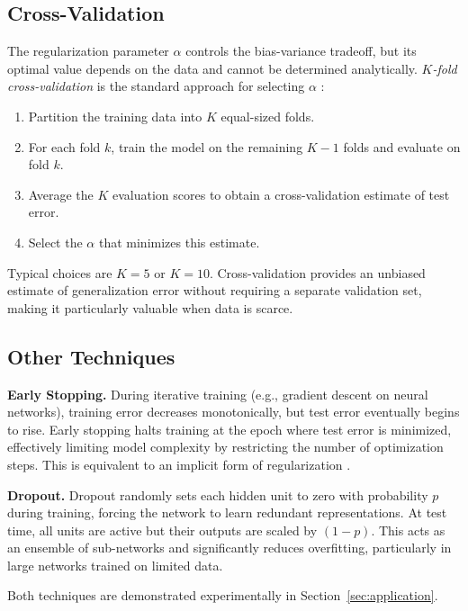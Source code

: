 \documentclass[12pt, a4paper]{article}
\begin{document}
\subsection{Cross-Validation}

The regularization parameter $\alpha$ controls the bias-variance tradeoff, but its
optimal value depends on the data and cannot be determined analytically.
\emph{$K$-fold cross-validation} is the standard approach for selecting $\alpha$
\citep{hastie2009elements}:

\begin{enumerate}
    \item Partition the training data into $K$ equal-sized folds.
    \item For each fold $k$, train the model on the remaining $K-1$ folds and evaluate
          on fold $k$.
    \item Average the $K$ evaluation scores to obtain a cross-validation estimate of
          test error.
    \item Select the $\alpha$ that minimizes this estimate.
\end{enumerate}

Typical choices are $K = 5$ or $K = 10$. Cross-validation provides an unbiased estimate
of generalization error without requiring a separate validation set, making it
particularly valuable when data is scarce.

\subsection{Other Techniques}

\textbf{Early Stopping.}
During iterative training (e.g., gradient descent on neural networks), training error
decreases monotonically, but test error eventually begins to rise. Early stopping halts
training at the epoch where test error is minimized, effectively limiting model
complexity by restricting the number of optimization steps. This is equivalent to an
implicit form of regularization \citep{goodfellow2016deep}.

\textbf{Dropout.}
Dropout \citep{srivastava2014dropout} randomly sets each hidden unit to zero with
probability $p$ during training, forcing the network to learn redundant representations.
At test time, all units are active but their outputs are scaled by $(1-p)$. This acts as
an ensemble of sub-networks and significantly reduces overfitting, particularly in large
networks trained on limited data.

Both techniques are demonstrated experimentally in Section~\ref{sec:application}.
\end{document}
